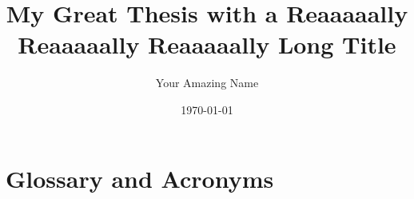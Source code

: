 \documentclass[
	verbose,
	english,
	type=bachelor-thesis, %
	license=CCBY, %
	paper=a4,  %
]{thesis}
\title{My Great Thesis with a Reaaaaally Reaaaaally Reaaaaally Long Title}
\author{Your Amazing Name}
\date{\today}
\begin{document}
\hideindraft{
	\frontmatter
		\maketitle
	
		
		
	
		\tableofcontents
		{
			\listoffigures
			\listoftables
			\lstlistoflistings
		}
	}
	
	\mainmatter
	
	
	
	
	
	

	\backmatter
	\printbibliography

	\let\clearpage\newpage
	\let\cleardoublepage\newpage
	\chapter{Glossary and Acronyms}
	\printglossaries
\end{document}
